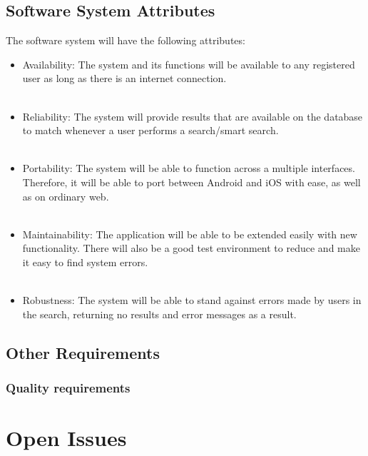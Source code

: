 \documentclass[a4paper,10pt]{article}
\begin{document}
{\begin{itemize}
	\subsection{Software System Attributes}
	The software system will have the following attributes:
		
		\begin{itemize}
		\item Availability: The system and its functions will be available to any registered user as long as there is an internet connection. 
\\\\
		\item Reliability: The system will provide results that are available on the database to match whenever a user performs a search/smart search.
\\\\
		\item Portability: The system will be able to function across a multiple interfaces. Therefore, it will be able to port between Android and iOS with ease, as well as on ordinary web. 
\\\\
		\item Maintainability: The application will be able to be extended easily with new functionality. There will also be a good test environment to reduce and make it easy to find system errors.  
\\\\
		\item Robustness: The system will be able to stand against errors made by users in the search, returning no results and error messages as a result.
		\end{itemize}
        
	\subsection{Other Requirements}

\subsubsection{Quality requirements}
\begin{itemize}
	
\end{itemize}


\clearpage

\section{Open Issues}

\end{itemize}}
\end{document}
